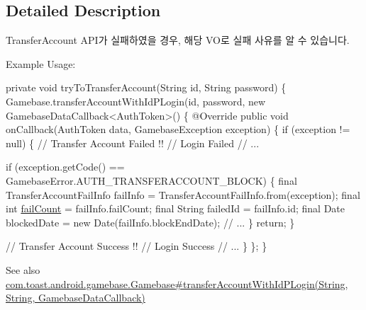 \subsection{Detailed Description}
Transfer\+Account A\+P\+I가 실패하였을 경우, 해당 V\+O로 실패 사유를 알 수 있습니다. 

Example Usage\+: 
\begin{DoxyCode}
\textcolor{keyword}{private} \textcolor{keywordtype}{void} tryToTransferAccount(String \textcolor{keywordtype}{id}, String password) \{
    Gamebase.transferAccountWithIdPLogin(\textcolor{keywordtype}{id}, password, \textcolor{keyword}{new} GamebaseDataCallback<AuthToken>() \{
        @Override
        \textcolor{keyword}{public} \textcolor{keywordtype}{void} onCallback(AuthToken data, GamebaseException exception) \{
            \textcolor{keywordflow}{if} (exception != null) \{
                \textcolor{comment}{// Transfer Account Failed !!}
                \textcolor{comment}{// Login Failed}
                \textcolor{comment}{// ...}

                \textcolor{keywordflow}{if} (exception.getCode() == GamebaseError.AUTH\_TRANSFERACCOUNT\_BLOCK) \{
                    \textcolor{keyword}{final} TransferAccountFailInfo failInfo = TransferAccountFailInfo.from(exception);
                    \textcolor{keyword}{final} \textcolor{keywordtype}{int} \hyperlink{classcom_1_1toast_1_1android_1_1gamebase_1_1auth_1_1transfer_1_1data_1_1_transfer_account_fail_info_a7e113fb3b583f0cc2f772dd8bf36f8ab}{failCount} = failInfo.failCount;
                    \textcolor{keyword}{final} String failedId = failInfo.id;
                    \textcolor{keyword}{final} Date blockedDate = \textcolor{keyword}{new} Date(failInfo.blockEndDate);
                    \textcolor{comment}{// ...}
                \}
                \textcolor{keywordflow}{return};
            \}

            \textcolor{comment}{// Transfer Account Success !!}
            \textcolor{comment}{// Login Success}
            \textcolor{comment}{// ...}
        \}
    \};
\}
\end{DoxyCode}


\begin{DoxySeeAlso}{See also}
\hyperlink{}{com.\+toast.\+android.\+gamebase.\+Gamebase\#transfer\+Account\+With\+Id\+P\+Login(\+String, String, Gamebase\+Data\+Callback)} 
\end{DoxySeeAlso}


